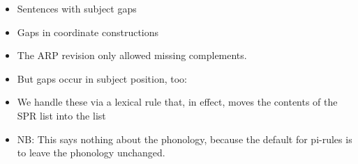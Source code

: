 \documentclass[a4paper,landscape,headrule,footrule]{foils}
\begin{document}
\begin{itemize}
\item Sentences with subject gaps
\item Gaps in coordinate constructions
\end{itemize}

\begin{itemize}
\item The ARP revision only allowed missing
complements.
\item But gaps occur in subject position, too:
  \begin{exe}
    \ex {}
  \end{exe}
\item We handle these via a lexical rule that, in effect,
moves the contents of the SPR list into the  list
\end{itemize}



\begin{itemize}
\item NB: This says nothing about the phonology, because the
default for pi-rules is to leave the phonology unchanged.
\end{itemize}


    
\end{document}
